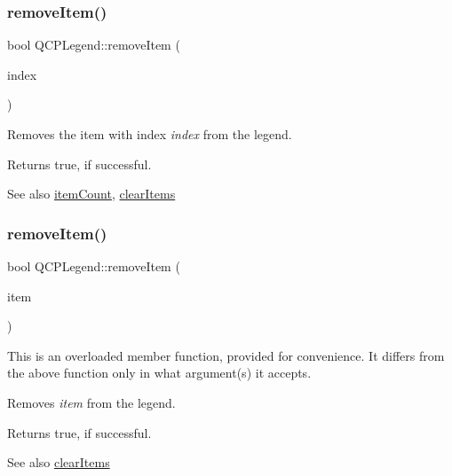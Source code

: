 \subsubsection{\texorpdfstring{remove\+Item()}{removeItem()}\hspace{0.1cm}{\footnotesize\ttfamily [1/2]}}
{\footnotesize\ttfamily bool Q\+C\+P\+Legend\+::remove\+Item (\begin{DoxyParamCaption}\item[{int}]{index }\end{DoxyParamCaption})}

Removes the item with index {\itshape index} from the legend.

Returns true, if successful.

\begin{DoxySeeAlso}{See also}
\hyperlink{class_q_c_p_legend_a57ab86ab8b2a3762d4c1455eb5452c88}{item\+Count}, \hyperlink{class_q_c_p_legend_a24795c7250eb5214fcea16b7217b4dfb}{clear\+Items} 
\end{DoxySeeAlso}
\hypertarget{class_q_c_p_legend_a2aea4ec6da2d454dd0b241a254d65082}{}\label{class_q_c_p_legend_a2aea4ec6da2d454dd0b241a254d65082} 
\subsubsection{\texorpdfstring{remove\+Item()}{removeItem()}\hspace{0.1cm}{\footnotesize\ttfamily [2/2]}}
{\footnotesize\ttfamily bool Q\+C\+P\+Legend\+::remove\+Item (\begin{DoxyParamCaption}\item[{\hyperlink{class_q_c_p_abstract_legend_item}{Q\+C\+P\+Abstract\+Legend\+Item} $\ast$}]{item }\end{DoxyParamCaption})}

This is an overloaded member function, provided for convenience. It differs from the above function only in what argument(s) it accepts.

Removes {\itshape item} from the legend.

Returns true, if successful.

\begin{DoxySeeAlso}{See also}
\hyperlink{class_q_c_p_legend_a24795c7250eb5214fcea16b7217b4dfb}{clear\+Items} 
\end{DoxySeeAlso}
\hypertarget{class_q_c_p_legend_ac7d9e567d5c551e09cd9bcc4306c5532}{}\label{class_q_c_p_legend_ac7d9e567d5c551e09cd9bcc4306c5532} 
